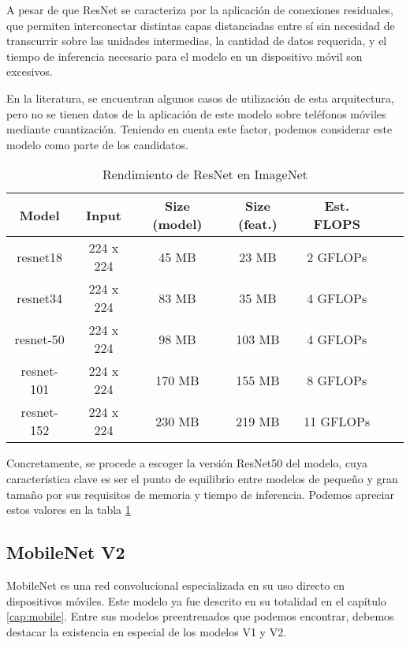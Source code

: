 A pesar de que ResNet se caracteriza por la aplicación de conexiones residuales, que permiten interconectar distintas capas distanciadas entre sí sin necesidad de transcurrir sobre las unidades intermedias, la cantidad de datos requerida, y el tiempo de inferencia necesario para el modelo en un dispositivo móvil son excesivos.

En la literatura, se encuentran algunos casos de utilización de esta arquitectura, pero no se tienen datos de la aplicación de este modelo sobre teléfonos móviles mediante cuantización. Teniendo en cuenta este factor, podemos considerar este modelo como parte de los candidatos.


\begin{table}[H]
	\centering
	\begin{tabular}{|c|c|c|c|c|c|c|}
		\hline
		\textbf{Model} & \textbf{ Input} & \textbf {Size (model)} & \textbf{Size (feat.)} & \textbf{Est. FLOPS} \\ \hline
		resnet18 & 224 x 224 & 45 MB & 23 MB & 2 GFLOPs  \\ \hline
		resnet34 & 224 x 224 & 83 MB & 35 MB & 4 GFLOPs   \\ \hline
		resnet-50 & 224 x 224 & 98 MB & 103 MB & 4 GFLOPs   \\ \hline
		resnet-101 & 224 x 224 & 170 MB & 155 MB & 8 GFLOPs  \\ \hline
		resnet-152 & 224 x 224 & 230 MB & 219 MB & 11 GFLOPs   \\ \hline
	\end{tabular}
	\caption{Rendimiento de ResNet en ImageNet \cite{resnetspecs}}
		\label{fig:tablaresnet}
\end{table}

Concretamente, se procede a escoger la versión ResNet50 del modelo, cuya característica clave es ser el punto de equilibrio entre modelos de pequeño y gran tamaño por sus requisitos de memoria y tiempo de inferencia. Podemos apreciar estos valores en la tabla \ref{fig:tablaresnet}



\subsection{MobileNet V2}

MobileNet es una red convolucional especializada en su uso directo en dispositivos móviles. Este modelo ya fue descrito en su totalidad en el capítulo \ref{cap:mobile}. Entre sus modelos preentrenados que podemos encontrar, debemos destacar la existencia en especial de los modelos V1 y V2.

